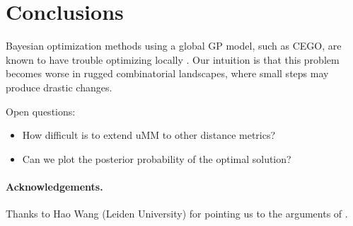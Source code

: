 \documentclass[runningheads]{llncs}
\begin{document}
\section{Conclusions}

Bayesian optimization methods using a global GP model, such as CEGO, are known
to have trouble optimizing locally \citep{EriPeaGar2019scalable}. Our
intuition is that this problem becomes worse in rugged combinatorial
landscapes, where small steps may produce drastic changes.

Open questions:
\begin{itemize}
\item How difficult is to extend uMM to other distance metrics?
\item Can we plot the posterior probability of the optimal solution?
\end{itemize}

\paragraph*{Acknowledgements.}

Thanks to Hao Wang (Leiden University) for pointing us to the arguments of
\citet{EriPeaGar2019scalable}.




\renewcommand{\doi}[1]{doi:\hspace{.16667em plus .08333em}\discretionary{}{}{}\href{https://doi.org/#1}{\urlstyle{rm}\nolinkurl{#1}}}


\end{document}
